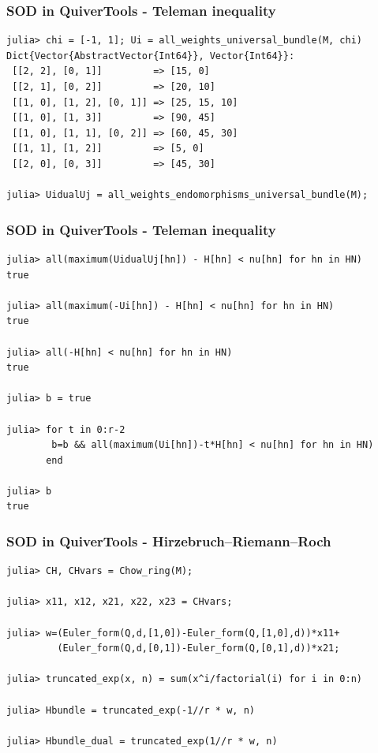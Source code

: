\documentclass{beamer}
\begin{document}
\begin{frame}[fragile]
    \frametitle{SOD in QuiverTools - Teleman inequality}
\scriptsize{
\begin{lstlisting}
julia> chi = [-1, 1]; Ui = all_weights_universal_bundle(M, chi)
Dict{Vector{AbstractVector{Int64}}, Vector{Int64}}:
 [[2, 2], [0, 1]]         => [15, 0]
 [[2, 1], [0, 2]]         => [20, 10]
 [[1, 0], [1, 2], [0, 1]] => [25, 15, 10]
 [[1, 0], [1, 3]]         => [90, 45]
 [[1, 0], [1, 1], [0, 2]] => [60, 45, 30]
 [[1, 1], [1, 2]]         => [5, 0]
 [[2, 0], [0, 3]]         => [45, 30]

julia> UidualUj = all_weights_endomorphisms_universal_bundle(M);
\end{lstlisting}
}
\end{frame}

\begin{frame}[fragile]
    \frametitle{SOD in QuiverTools - Teleman inequality}
\scriptsize{
\begin{lstlisting}
julia> all(maximum(UidualUj[hn]) - H[hn] < nu[hn] for hn in HN)
true

julia> all(maximum(-Ui[hn]) - H[hn] < nu[hn] for hn in HN)
true

julia> all(-H[hn] < nu[hn] for hn in HN)
true

julia> b = true

julia> for t in 0:r-2
        b=b && all(maximum(Ui[hn])-t*H[hn] < nu[hn] for hn in HN)
       end

julia> b
true
\end{lstlisting}
}
\end{frame}

\begin{frame}[fragile]
    \frametitle{SOD in QuiverTools - Hirzebruch--Riemann--Roch}
\scriptsize{
\begin{lstlisting}
julia> CH, CHvars = Chow_ring(M);

julia> x11, x12, x21, x22, x23 = CHvars;

julia> w=(Euler_form(Q,d,[1,0])-Euler_form(Q,[1,0],d))*x11+
         (Euler_form(Q,d,[0,1])-Euler_form(Q,[0,1],d))*x21;

julia> truncated_exp(x, n) = sum(x^i/factorial(i) for i in 0:n)

julia> Hbundle = truncated_exp(-1//r * w, n)

julia> Hbundle_dual = truncated_exp(1//r * w, n)
\end{lstlisting}
}

\end{frame}
\end{document}

